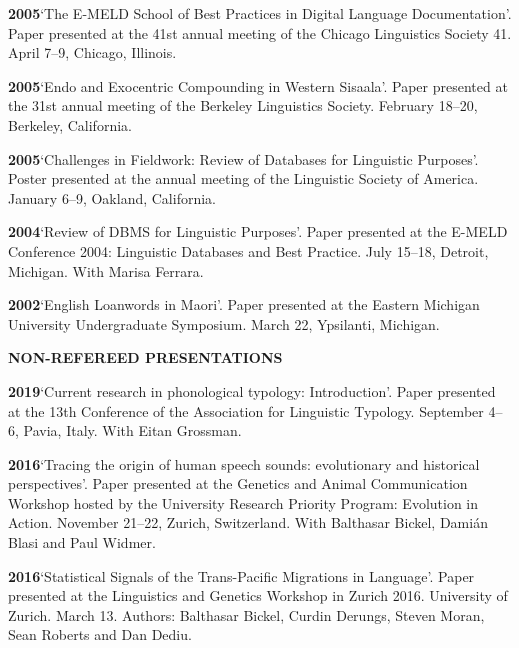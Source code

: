 \documentclass[11pt]{article}
\newcommand{\hangpara}{
 \setlength{\parindent}{0in} %
 \hangindent=0.42in %
}
\begin{document}
\vskip 6pt
\hangpara
{\bf 2005}\hspace{1ex}`The E-MELD School of Best Practices in Digital Language Documentation'. Paper presented at the 41st annual meeting of the Chicago Linguistics Society 41. April 7--9, Chicago, Illinois.

\vskip 6pt
\hangpara
{\bf 2005}\hspace{1ex}`Endo and Exocentric Compounding in Western Sisaala'. Paper presented at the 31st annual meeting of the Berkeley Linguistics Society. February 18--20, Berkeley, California.

\vskip 6pt
\hangpara
{\bf 2005}\hspace{1ex}`Challenges in Fieldwork: Review of Databases for Linguistic Purposes'. Poster presented at the annual meeting of the Linguistic Society of America. January 6--9, Oakland, California.

\vskip 6pt
\hangpara
{\bf 2004}\hspace{1ex}`Review of DBMS for Linguistic Purposes'. Paper presented at the E-MELD Conference 2004: Linguistic Databases and Best Practice. July 15--18, Detroit, Michigan. With Marisa Ferrara.

\vskip 6pt
\hangpara
{\bf 2002}\hspace{1ex}`English Loanwords in Maori'. Paper presented at the Eastern Michigan University Undergraduate Symposium. March 22, Ypsilanti, Michigan.


\vskip 20pt
\begin{flushleft}
{\bf NON-REFEREED PRESENTATIONS}
\end{flushleft}

\hangpara
{\bf 2019}\hspace{1ex}`Current research in phonological typology: Introduction'. Paper presented at the 13th Conference of the Association for Linguistic Typology. September 4--6, Pavia, Italy. With Eitan Grossman.

\hangpara
\vskip 6pt
{\bf 2016}\hspace{1ex}`Tracing the origin of human speech sounds: evolutionary and historical perspectives'. Paper presented at the Genetics and Animal Communication Workshop hosted by the University Research Priority Program: Evolution in Action. November 21--22, Zurich, Switzerland. With Balthasar Bickel, Dami{\'a}n Blasi and Paul Widmer.

\hangpara
\vskip 6pt
{\bf 2016}\hspace{1ex}`Statistical Signals of the Trans-Pacific Migrations in Language'. Paper presented at the Linguistics and Genetics Workshop in Zurich 2016. University of Zurich. March 13. Authors: Balthasar Bickel, Curdin Derungs, Steven Moran, Sean Roberts and Dan Dediu.
\end{document}
